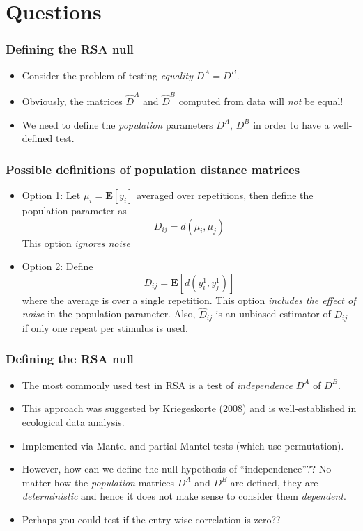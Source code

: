 \documentclass{beamer}
\newcommand{\E}{\textbf{E}}
\begin{document}
\section{Questions}

\begin{frame}
\frametitle{Defining the RSA null}
\begin{itemize}
\item Consider the problem of testing \emph{equality} $D^A = D^B$.
\item Obviously, the matrices $\hat{D}^A$ and $\hat{D}^B$ computed from data will \emph{not} be equal!
\item We need to define the \emph{population} parameters $D^A$, $D^B$ in order to have a well-defined test.
\end{itemize}
\end{frame}

\begin{frame}
\frametitle{Possible definitions of population distance matrices}
\begin{itemize}
\item Option 1: Let $\mu_i = \E[y_i]$ averaged over repetitions, then define the population parameter as
\[
D_{ij} = d(\mu_i, \mu_j)
\]
This option \emph{ignores noise}
\item Option 2: Define
\[
D_{ij} = \E[d(y_i^1, y_j^1)]
\]
where the average is over a single repetition.  This option \emph{includes the effect of noise} in the population parameter.
Also, $\hat{D}_{ij}$ is an unbiased estimator of $D_{ij}$ if only one repeat per stimulus is used.
\end{itemize}
\end{frame}

\begin{frame}
\frametitle{Defining the RSA null}
\begin{itemize}
\item The most commonly used test in RSA is a test of \emph{independence} $D^A$ of $D^B$.
\item This approach was suggested by Kriegeskorte (2008) and is well-established in ecological data analysis.
\item Implemented via Mantel and partial Mantel tests (which use permutation).
\item However, how can we define the null hypothesis of
  ``independence''??  No matter how the \emph{population} matrices
  $D^A$ and $D^B$ are defined, they are \emph{deterministic} and hence
  it does not make sense to consider them \emph{dependent}.
\item Perhaps you could test if the entry-wise correlation is zero??
\end{itemize}
\end{frame}
\end{document}
